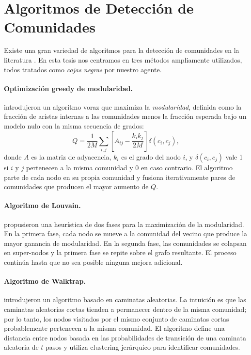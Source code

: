 \documentclass[11pt,a4paper,twoside]{tesis}
\begin{document}
\section{Algoritmos de Detección de Comunidades}
\label{sec:deteccion}

Existe una gran variedad de algoritmos para la detección de comunidades en la literatura
\cite{Fortunato-2010}. En esta tesis nos centramos en tres métodos ampliamente
utilizados, todos tratados como \emph{cajas negras} por nuestro agente.

\paragraph{Optimización greedy de modularidad.}
\textcite{clauset2004greedy} introdujeron un algoritmo voraz que maximiza la
\emph{modularidad}, definida como la fracción de aristas internas a las comunidades
menos la fracción esperada bajo un modelo nulo con la misma secuencia de grados:
\[
Q = \frac{1}{2M}\sum_{i,j}\left[A_{ij} - \frac{k_i k_j}{2M}\right]\delta(c_i, c_j),
\]
donde $A$ es la matriz de adyacencia, $k_i$ es el grado del nodo $i$, y $\delta(c_i,c_j)$
vale 1 si $i$ y $j$ pertenecen a la misma comunidad y 0 en caso contrario. El algoritmo
parte de cada nodo en su propia comunidad y fusiona iterativamente pares de comunidades
que producen el mayor aumento de $Q$.

\paragraph{Algoritmo de Louvain.}
\textcite{blondel2008louvain} propusieron una heurística de dos fases para la
maximización de la modularidad. En la primera fase, cada nodo se mueve a la comunidad
del vecino que produce la mayor ganancia de modularidad. En la segunda fase, las
comunidades se colapsan en super-nodos y la primera fase se repite sobre el grafo
resultante. El proceso continúa hasta que no sea posible ninguna mejora adicional.

\paragraph{Algoritmo de Walktrap.}
\textcite{pons2005walktrap} introdujeron un algoritmo basado en caminatas aleatorias.
La intuición es que las caminatas aleatorias cortas tienden a permanecer dentro de la
misma comunidad; por lo tanto, los nodos visitados por el mismo conjunto de caminatas
cortas probablemente pertenecen a la misma comunidad. El algoritmo define una distancia
entre nodos basada en las probabilidades de transición de una caminata aleatoria de $t$
pasos y utiliza clustering jerárquico para identificar comunidades.
\end{document}
